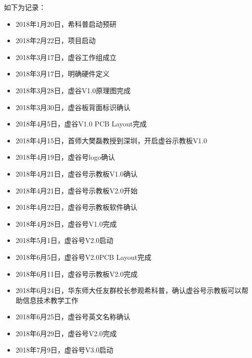 \documentclass[letterpaper,10pt,english]{sphinxmanual}
\begin{document}
如下为记录：
\begin{itemize}
\item {} 
2018年1月20日，希科普启动预研

\item {} 
2018年2月22日，项目启动

\item {} 
2018年3月17日，虚谷工作组成立

\item {} 
2018年3月17日，明确硬件定义

\item {} 
2018年3月28日，虚谷V1.0原理图完成

\item {} 
2018年3月30日，虚谷板背面标识确认

\item {} 
2018年4月5日，虚谷V1.0 PCB Layout完成

\item {} 
2018年4月15日，首师大樊磊教授到深圳，开启虚谷示教板V1.0

\item {} 
2018年4月19日，虚谷号logo确认

\item {} 
2018年4月21日，虚谷号示教板V1.0确认

\item {} 
2018年4月21日，虚谷号示教板V2.0开始

\item {} 
2018年4月22日，虚谷号示教板软件确认

\item {} 
2018年4月28日，虚谷号V1.0完成

\item {} 
2018年5月1日，虚谷号V2.0启动

\item {} 
2018年6月5日，虚谷号V2.0PCB Layout完成

\item {} 
2018年6月11日，虚谷号示教板V2.0完成

\item {} 
2018年6月24日，华东师大任友群校长参观希科普，确认虚谷号示教板可以帮助信息技术教学工作

\item {} 
2018年6月25日，虚谷号英文名称确认

\item {} 
2018年6月29日，虚谷号V2.0完成

\item {} 
2018年7月9日，虚谷号V3.0启动


\end{itemize}
\end{document}

